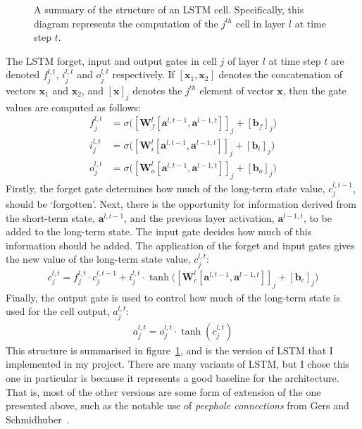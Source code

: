 \documentclass[a4paper, 12pt]{report}
\newcommand{\tit}[1]{\textit{#1}}
\begin{document}
\begin{figure}[h]
\caption{A summary of the structure of an LSTM cell. Specifically, this diagram represents the computation of the $j^{th}$ cell in layer $l$ at time step $t$.}
\label{fig:lstm_structure}
\end{figure}

The LSTM forget, input and output gates in cell $j$ of layer $l$ at time step $t$ are denoted $f_j^{l, t}$, $i_j^{l, t}$ and $o_j^{l, t}$ respectively. If $[\mathbf{x}_1, \mathbf{x}_2]$ denotes the concatenation of vectors $\mathbf{x}_1$ and $\mathbf{x}_2$, and $[\mathbf{x}]_j$ denotes the $j^{th}$ element of vector $\mathbf{x}$, then the gate values are computed as follows:
\begin{align}
	f_j^{l, t} &= \sigma \big( [\mathbf{W}_f^l [\mathbf{a}^{l, t - 1}, \mathbf{a}^{l - 1, t}]]_j + [\mathbf{b}_f]_j \big) \\
	i_j^{l, t} &= \sigma \big( [\mathbf{W}_i^l [\mathbf{a}^{l, t - 1}, \mathbf{a}^{l - 1, t}]]_j + [\mathbf{b}_i]_j \big) \\
	o_j^{l, t} &= \sigma \big( [\mathbf{W}_o^l [\mathbf{a}^{l, t - 1}, \mathbf{a}^{l - 1, t}]]_j + [\mathbf{b}_o]_j \big)
\end{align}
Firstly, the forget gate determines how much of the long-term state value, $c_j^{l, t - 1}$, should be `forgotten'. Next, there is the opportunity for information derived from the short-term state, $\mathbf{a}^{l, t - 1}$, and the previous layer activation, $\mathbf{a}^{l - 1, t}$, to be added to the long-term state. The input gate decides how much of this information should be added. The application of the forget and input gates gives the new value of the long-term state value, $c_j^{l, t}$:
\begin{gather}
	c_j^{l, t} = f_j^{l, t} \cdot c_j^{l, t - 1} + i_j^{l, t} \cdot \tanh \big( [\mathbf{W}_c^l [\mathbf{a}^{l, t - 1}, \mathbf{a}^{l - 1, t}]]_j + [\mathbf{b}_c]_j \big)
\end{gather}
Finally, the output gate is used to control how much of the long-term state is used for the cell output, $a_j^{l, t}$:
\begin{gather}
	a_j^{l, t} = o_j^{l, t} \cdot \tanh (c_j^{l, t})
\end{gather}
This structure is summarised in figure~\ref{fig:lstm_structure}, and is the version of LSTM that I implemented in my project. There are many variants of LSTM, but I chose this one in particular is because it represents a good baseline for the architecture. That is, most of the other versions are some form of extension of the one presented above, such as the notable use of \tit{peephole connections} from Gers and Schmidhuber~\cite{peephole:gers2000}.
\end{document}
